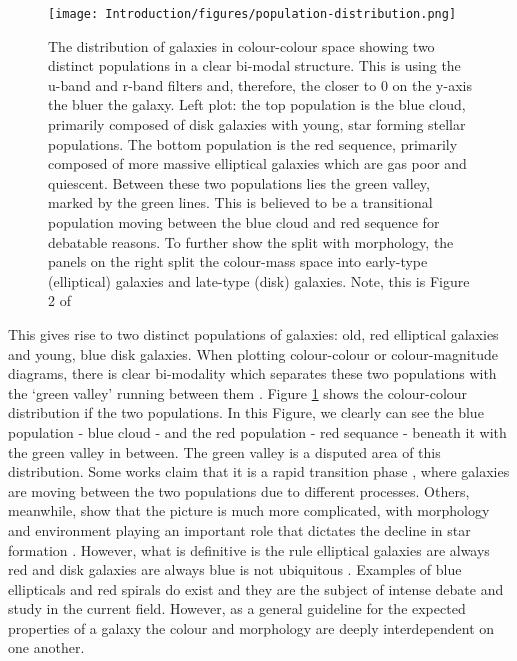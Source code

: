 \begin{figure}
    \centering
    \texttt{[image: Introduction/figures/population-distribution.png]}
    \caption[The distribution of galaxies in colour-colour space showing two distinct populations in a clear bi-modal structure.]{The distribution of galaxies in colour-colour space showing two distinct populations in a clear bi-modal structure. This is using the u-band and r-band filters and, therefore, the closer to 0 on the y-axis the bluer the galaxy. Left plot: the top population is the blue cloud, primarily composed of disk galaxies with young, star forming stellar populations. The bottom population is the red sequence, primarily composed of more massive elliptical galaxies which are gas poor and quiescent. Between these two populations lies the green valley, marked by the green lines. This is believed to be a transitional population moving between the blue cloud and red sequence for debatable reasons. To further show the split with morphology, the panels on the right split the colour-mass space into early-type (elliptical) galaxies and late-type (disk) galaxies. Note, this is Figure 2 of \citet{2014MNRAS.440..889S}}
    \label{fig:blue-red-population}
\end{figure}

This gives rise to two distinct populations of galaxies: old, red elliptical galaxies and young, blue disk galaxies. When plotting colour-colour or colour-magnitude diagrams, there is clear bi-modality which separates these two populations with the `green valley' running between them \citep{2001AJ....122.1861S}. Figure \ref{fig:blue-red-population} shows the colour-colour distribution if the two populations. In this Figure, we clearly can see the blue population - blue cloud - and the red population - red sequance - beneath it with the green valley in between. The green valley is a disputed area of this distribution. Some works claim that it is a rapid transition phase \citep{2007ApJS..173..315S, 2015MNRAS.450..435S}, where galaxies are moving between the two populations due to different processes. Others, meanwhile, show that the picture is much more complicated, with morphology and environment playing an important role that dictates the decline in star formation \citep{2014MNRAS.440..889S}. However, what is definitive is the rule elliptical galaxies are always red and disk galaxies are always blue is not ubiquitous \citep{2022MNRAS.510.4126S}. Examples of blue ellipticals and red spirals do exist \citep{2009MNRAS.396..818S, 2010MNRAS.405..783M, 2022AJ....163..150K} and they are the subject of intense debate and study in the current field. However, as a general guideline for the expected properties of a galaxy the colour and morphology are deeply interdependent on one another.

